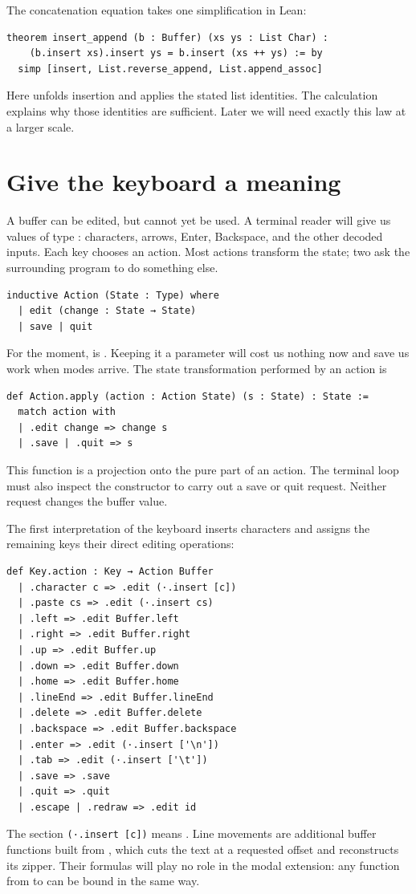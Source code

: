 \documentclass[11pt]{article}
\newcommand{\code}[1]{\texttt{\detokenize{#1}}}
\begin{document}
The concatenation equation takes one simplification in Lean:
\begin{lstlisting}[language=Lean]
theorem insert_append (b : Buffer) (xs ys : List Char) :
    (b.insert xs).insert ys = b.insert (xs ++ ys) := by
  simp [insert, List.reverse_append, List.append_assoc]
\end{lstlisting}
Here \code{simp} unfolds insertion and applies the stated list identities.
The calculation explains why those identities are sufficient. Later we will
need exactly this law at a larger scale.

\section{Give the keyboard a meaning}
\label{sec:direct}

A buffer can be edited, but cannot yet be used. A terminal reader will give us
values of type \code{Key}: characters, arrows, Enter, Backspace, and the other
decoded inputs. Each key chooses an action. Most actions transform the state;
two ask the surrounding program to do something else.
\begin{lstlisting}[language=Lean]
inductive Action (State : Type) where
  | edit (change : State → State)
  | save | quit
\end{lstlisting}
For the moment, \code{State} is \code{Buffer}. Keeping it a parameter will
cost us nothing now and save us work when modes arrive. The state transformation
performed by an action is
\begin{lstlisting}[language=Lean]
def Action.apply (action : Action State) (s : State) : State :=
  match action with
  | .edit change => change s
  | .save | .quit => s
\end{lstlisting}
This function is a projection onto the pure part of an action. The terminal
loop must also inspect the constructor to carry out a save or quit request.
Neither request changes the buffer value.

The first interpretation of the keyboard inserts characters and assigns the
remaining keys their direct editing operations:
\begin{lstlisting}[language=Lean]
def Key.action : Key → Action Buffer
  | .character c => .edit (·.insert [c])
  | .paste cs => .edit (·.insert cs)
  | .left => .edit Buffer.left
  | .right => .edit Buffer.right
  | .up => .edit Buffer.up
  | .down => .edit Buffer.down
  | .home => .edit Buffer.home
  | .lineEnd => .edit Buffer.lineEnd
  | .delete => .edit Buffer.delete
  | .backspace => .edit Buffer.backspace
  | .enter => .edit (·.insert ['\n'])
  | .tab => .edit (·.insert ['\t'])
  | .save => .save
  | .quit => .quit
  | .escape | .redraw => .edit id
\end{lstlisting}
The section \lstinline[language=Lean]|(·.insert [c])| means
\code{fun b => b.insert [c]}.
Line movements are additional buffer functions built from \code{seek}, which
cuts the text at a requested offset and reconstructs its zipper. Their formulas
will play no role in the modal extension: any function from \code{Buffer} to
\code{Buffer} can be bound in the same way.
\end{document}
